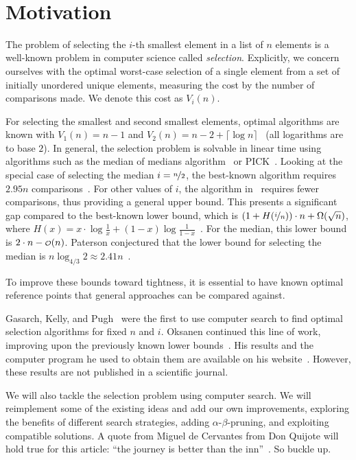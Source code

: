 \documentclass[twoside,leqno,twocolumn]{article}
\newcommand\smallO{
\mathchoice
{{\scriptstyle\mathcal{O}}}%
{{\scriptstyle\mathcal{O}}}%
{{\scriptscriptstyle\mathcal{O}}}%
{\scalebox{.50}{$\scriptscriptstyle\mathcal{O}$}}%
}
\begin{document}
\newpage~
\newpage

\section{Motivation} \label{sec:motivation}

The problem of selecting the $i$-th smallest element in a list of $n$ elements is a well-known problem in computer science called \textit{selection}.
Explicitly, we concern ourselves with the optimal worst-case selection of a single element from a set of initially unordered unique elements, measuring the cost by the number of comparisons made.
We denote this cost as $V_i(n)$.

For selecting the smallest and second smallest elements, optimal algorithms are known with $V_1(n) = n - 1$ and $V_2(n) = n - 2 + \lceil \log n\rceil$~\cite{Knuth1973} (all logarithms are to base $2$).
In general, the selection problem is solvable in linear time using algorithms such as the median of medians algorithm~\cite{Schoening1993} or PICK~\cite{Blum1972}.
Looking at the special case of selecting the median $i = \nicefrac{n}{2}$, the best-known algorithm requires $2.95n$ comparisons~\cite{dor1999selecting}.
For other values of $i$, the algorithm in~\cite{dor1999selecting} requires fewer comparisons, thus providing a general upper bound.
This presents a significant gap compared to the best-known lower bound, which is $\left (1 + H(\nicefrac{i}{n}) \right ) \cdot n + \Omega(\sqrt n)$, where $H(x) = x \cdot \log \frac{1}{x} + (1 - x) \log \frac{1}{1 - x}$~\cite{bent1985finding}.
For the median, this lower bound is $2 \cdot n - \smallO(n)$.
Paterson conjectured that the lower bound for selecting the median is $n \log_{4/3} 2 \approx 2.41n$~\cite{paterson1996progress}.

To improve these bounds toward tightness, it is essential to have known optimal reference points that general approaches can be compared against.

Gasarch, Kelly, and Pugh~\cite{Gasarch1996} were the first to use computer search to find optimal selection algorithms for fixed $n$ and $i$.
Oksanen continued this line of work, improving upon the previously known lower bounds~\cite{Oksanen2006}.
His results and the computer program he used to obtain them are available on his website~\cite{Oksanen}.
However, these results are not published in a scientific journal.

We will also tackle the selection problem using computer search.
We will reimplement some of the existing ideas and add our own improvements, exploring the benefits of different search strategies, adding $\alpha$-$\beta$-pruning, and exploiting compatible solutions.
A quote from Miguel de Cervantes from Don Quijote will hold true for this article: ``the journey is better than the inn''~\cite{cervantes_don_quijote}.
So buckle up.
\end{document}
